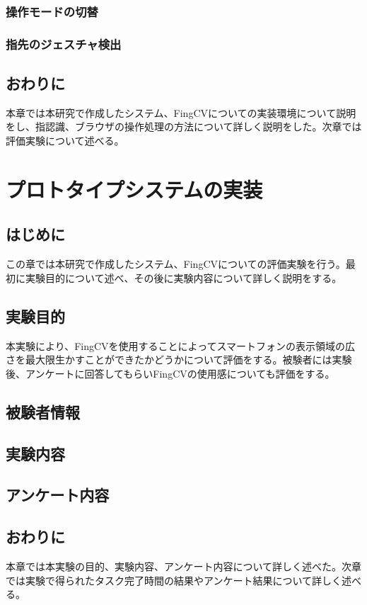 \documentclass[11pt,a4j, titlepage]{jarticle} %
\begin{document}
\subsubsection{操作モードの切替}


\subsubsection{指先のジェスチャ検出}


\subsection{おわりに}
本章では本研究で作成したシステム、FingCVについての実装環境について説明をし、指認識、ブラウザの操作処理の方法について詳しく説明をした。次章では評価実験について述べる。

\newpage
\section{プロトタイプシステムの実装}
\subsection{はじめに}
この章では本研究で作成したシステム、FingCVについての評価実験を行う。最初に実験目的について述べ、その後に実験内容について詳しく説明をする。

\subsection{実験目的}
本実験により、FingCVを使用することによってスマートフォンの表示領域の広さを最大限生かすことができたかどうかについて評価をする。被験者には実験後、アンケートに回答してもらいFingCVの使用感についても評価をする。

\subsection{被験者情報}


\subsection{実験内容}


\subsection{アンケート内容}

\subsection{おわりに}
本章では本実験の目的、実験内容、アンケート内容について詳しく述べた。次章では実験で得られたタスク完了時間の結果やアンケート結果について詳しく述べる。
\end{document}
